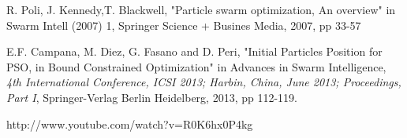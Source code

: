 \documentclass[a4paper, 10pt, conference]{ieeeconf}      %
\begin{document}
\begin{thebibliography}{99}
R. Poli, J. Kennedy,T. Blackwell, "Particle swarm optimization, An overview" in Swarm Intell (2007) 1, Springer Science + Busines Media, 2007, pp 33-57

E.F. Campana, M. Diez, G. Fasano and D. Peri, "Initial Particles Position for PSO,
in Bound Constrained Optimization" in Advances in Swarm Intelligence, {\it 4th International Conference, ICSI 2013; Harbin, China, June 2013; Proceedings, Part I}, Springer-Verlag Berlin Heidelberg, 2013, pp 112-119.

http://www.youtube.com/watch?v=R0K6hx0P4kg

\end{thebibliography}
\end{document}
